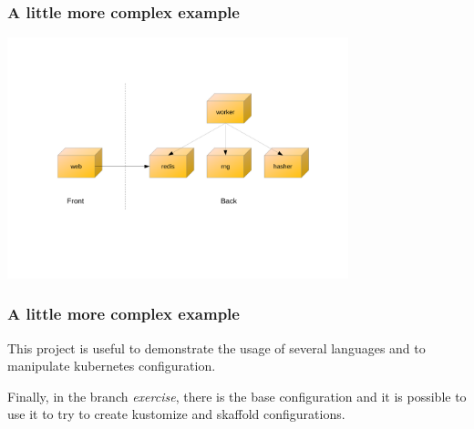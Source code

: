 	\begin{frame}
		\frametitle{A little more complex example}
		
		\begin{center}
		\includegraphics[height=7cm]{../../../resources/color/kubercoins.pdf}
		\end{center}
		
	\end{frame}
	
	\begin{frame}
		\frametitle{A little more complex example}
		
		This project is useful to demonstrate the usage of several languages and to manipulate kubernetes configuration.
		
		\medskip
		
		Finally, in the branch \textit{exercise}, there is the base configuration and it is possible to use it to try to create kustomize and skaffold configurations.
	\end{frame}